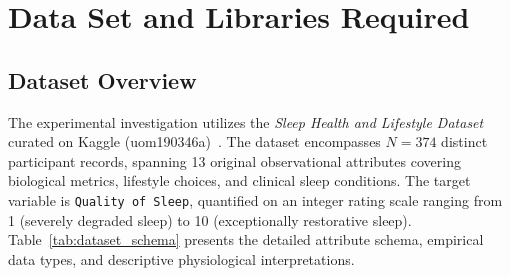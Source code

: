 \documentclass[12pt,a4paper]{article}
\begin{document}
\section{Data Set and Libraries Required}

\subsection{Dataset Overview}
The experimental investigation utilizes the \textit{Sleep Health and Lifestyle Dataset} curated on Kaggle (uom190346a)~\cite{kaggle_sleep}. The dataset encompasses $N = 374$ distinct participant records, spanning 13 original observational attributes covering biological metrics, lifestyle choices, and clinical sleep conditions. The target variable is \texttt{Quality of Sleep}, quantified on an integer rating scale ranging from 1 (severely degraded sleep) to 10 (exceptionally restorative sleep). Table~\ref{tab:dataset_schema} presents the detailed attribute schema, empirical data types, and descriptive physiological interpretations.
\end{document}
